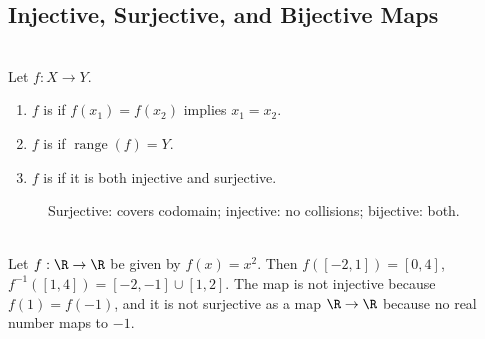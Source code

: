 \subsection{Injective, Surjective, and Bijective Maps}

\begin{definition} \label{def:injective-surjective-bijective} \\
Let $f:X\to Y$.
\begin{enumerate}[label=\roman*.]
\setlength{\itemsep}{0pt}
\item $f$ is  if $f(x_1)=f(x_2)$ implies $x_1=x_2$.
\item $f$ is  if $\operatorname{range}(f)=Y$.
\item $f$ is  if it is both injective and surjective.
\end{enumerate}
\end{definition}

\begin{figure}[H]
  \centering
  
  \caption{Surjective: covers codomain; injective: no collisions; bijective: both.}
  \label{fig:injective-surjective-bijective-maps}
\end{figure}

\begin{example} \label{ex:square-map-image-preimage} \\
Let $f:\R\to\R$ be given by $f(x)=x^2$. Then $f([-2,1])=[0,4]$, $f^{-1}([1,4])=[-2,-1]\cup[1,2]$. The map is not injective because $f(1)=f(-1)$, and it is not surjective as a map $\R\to\R$ because no real number maps to $-1$.
\end{example}
